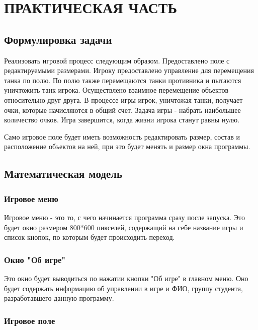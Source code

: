 \chapter{\label{ch:ch02}ПРАКТИЧЕСКАЯ ЧАСТЬ}

\section{\label{sec:ch01/sec01}Формулировка задачи}
Реализовать игровой процесс следующим образом. Предоставлено поле с редактируемыми размерами. Игроку предоставлено управление для перемещения танка по полю. По полю также перемещаются танки противника и пытаются уничтожить танк игрока. Осуществлено взаимное перемещение объектов относительно друг друга. В процессе игры игрок, уничтожая танки, получает очки, которые начисляются в общий счет. Задача игры - набрать наибольшее количество очков. Игра завершится, когда жизни игрока станут равны нулю.

Само игровое поле будет иметь возможность редактировать размер, состав и расположение объектов на ней, при это будет менять и размер окна программы.

\section{\label{sec:ch01/sec02}Математическая модель}

\subsection{\label{sec:ch01/sec03/sub01}Игровое меню}

Игровое меню - это то, с чего начинается программа сразу после запуска. Это будет окно размером 800*600 пикселей, содержащий на себе название игры и список кнопок, по которым будет происходить переход.

\subsection{\label{sec:ch01/sec03/sub03}Окно "Об игре"}

Это окно будет выводиться по нажатии кнопки "Об игре" в главном меню. Оно будет содержать информацию об управлении в игре и ФИО, группу студента, разработавшего данную программу.

\subsection{\label{sec:ch01/sec03/sub04}Игровое поле}

